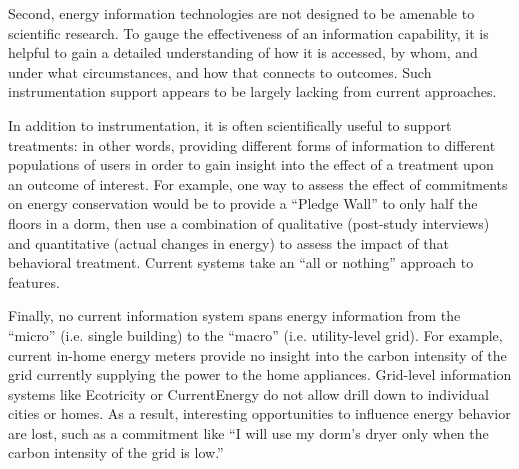 Second, energy information technologies are not designed to be amenable to
scientific research.  To gauge the effectiveness of an information
capability, it is helpful to gain a detailed understanding of how it is
accessed, by whom, and under what circumstances, and how that connects
to outcomes.  Such instrumentation support appears to be largely lacking
from current approaches.

In addition to instrumentation, it is often scientifically useful to
support treatments: in other words, providing different forms of
information to different populations of users in order to gain insight into
the effect of a treatment upon an outcome of interest. For example, one way
to assess the effect of commitments on energy conservation would be to
provide a ``Pledge Wall'' to only half the floors in a dorm, then use a
combination of qualitative (post-study interviews) and quantitative (actual
changes in energy) to assess the impact of that behavioral
treatment. Current systems take an ``all or nothing'' approach to
features. 

Finally, no current information system spans energy information from the ``micro''
(i.e. single building) to the ``macro'' (i.e. utility-level grid).  For
example, current in-home energy meters provide no insight into the carbon
intensity of the grid currently supplying the power to the home appliances.
Grid-level information systems like Ecotricity or CurrentEnergy do not
allow drill down to individual cities or homes.  As a result, interesting
opportunities to influence energy behavior are lost, such as a commitment
like ``I will use my dorm's dryer only when the carbon intensity of the
grid is low.''



